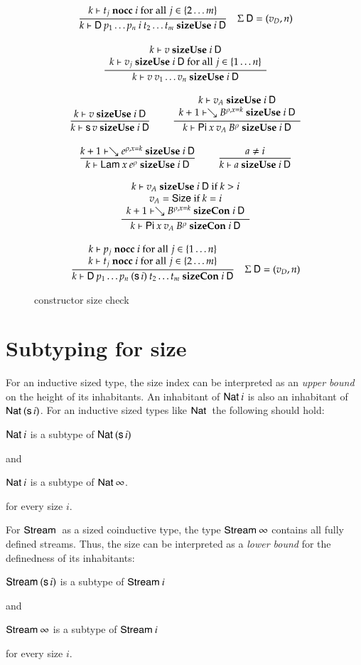 \begin{figure}[htp]
\begin{gather*}
\ \dfrac{k\vdash t_j\mbox{ \textbf{nocc} }i \mbox { for all } j \in \{ 2 \ldots m\}}{k\vdash\mathsf{D} \: p_1 \ldots p_n \: i \: t_2 \ldots t_m\mbox{ \textbf{sizeUse} }i\:\mathsf{D}}
{\quad \Sigma \: \mathsf{D} = (v_D,n)}
\\[2ex]
\ \dfrac{\begin{array}[b]{c}k\vdash v\mbox{ \textbf{sizeUse} }i\:\mathsf{D}\\k\vdash v_j\mbox{ \textbf{sizeUse} }i\:\mathsf{D} \mbox { for all } j \in \{ 1 \ldots n\}\end{array}}{k\vdash v \: v_1 \ldots v_n\mbox{ \textbf{sizeUse} }i\:\mathsf{D}}
\\[2ex]
\ \dfrac{k\vdash v\mbox{ \textbf{sizeUse} }i\:\mathsf{D}}{k\vdash\mathsf{s}\, v\mbox{ \textbf{sizeUse} }i\:\mathsf{D}}
\qquad
\ \dfrac{\begin{array}[b]{c}k\vdash v_A\mbox{ \textbf{sizeUse} }i\:\mathsf{D}\\k+1\vdash\searrow B^{\rho,x=k}\mbox{ \textbf{sizeUse} }i\:\mathsf{D}\end{array}}{k\vdash\mathsf{Pi} \: x \: v_A \: B^{\rho}\mbox{ \textbf{sizeUse} }i\:\mathsf{D}}
\\[2ex]
\ \dfrac{k+1\vdash\searrow e^{\rho,x=k}\mbox{ \textbf{sizeUse} }i\:\mathsf{D}}{k\vdash\mathsf{Lam} \: x \: e^{\rho}\mbox{ \textbf{sizeUse} }i\:\mathsf{D}}
\qquad
\ \dfrac{a \neq i}{k\vdash a\mbox{ \textbf{sizeUse} }i\:\mathsf{D}}
\\[2ex]
\ \dfrac{\begin{array}[b]{c}k\vdash v_A\mbox{ \textbf{sizeUse} }i\:\mathsf{D} \mbox{ if } k > i\\v_A = \mathsf{Size} \mbox { if } k = i \\k+1\vdash\searrow B^{\rho,x=k}\mbox{ \textbf{sizeCon} }i\:\mathsf{D}\end{array}}{k\vdash\mathsf{Pi} \: x \: v_A \: B^{\rho}\mbox{ \textbf{sizeCon} }i\:\mathsf{D}}
\\[2ex]
\ \dfrac{\begin{array}[b]{c}k\vdash p_j\mbox{ \textbf{nocc} }i \mbox { for all } j \in \{ 1 \ldots n\}\\k\vdash t_j\mbox{ \textbf{nocc} }i \mbox { for all } j \in \{ 2 \ldots m\}\end{array}}{k\vdash\mathsf{D} \:p_1 \ldots p_n \: (\mathsf{s}\, i) \:t_2 \ldots t_m\mbox{ \textbf{sizeCon} }i\:\mathsf{D}}
{\quad \Sigma \: \mathsf{D} = (v_D,n)}
\end{gather*}
\caption{constructor size check}
\label{fsizecon}
\end{figure}


\section{Subtyping for size}

For an inductive sized type, the size index can be interpreted as an \emph{upper bound} on the height of its inhabitants.
An inhabitant of $\mathsf{Nat}\: i$ is also an inhabitant of $\mathsf{Nat}\: (\mathsf{s}\, i)$. For an inductive sized types like $\mathsf{Nat}\:$ the following should hold:
\begin{bsp}
$\mathsf{Nat}\: i$ is a subtype of $\mathsf{Nat}\: (\mathsf{s}\, i)$  
\end{bsp}
and
\begin{bsp}
$\mathsf{Nat}\: i$ is a subtype of $\mathsf{Nat}\: \infty$.
\end{bsp}
for every size $i$.

For $\mathsf{Stream}\:$ as a sized coinductive type, the type $\mathsf{Stream}\: \infty$ contains all fully defined streams.
Thus, the size can be interpreted as a \emph{lower bound} for the definedness of its inhabitants:
\begin{bsp}
$\mathsf{Stream}\: (\mathsf{s}\, i) $ is a subtype of $\mathsf{Stream}\: i$
\end{bsp}
and
\begin{bsp}
$\mathsf{Stream}\: \infty$ is a subtype of $\mathsf{Stream}\: i$
\end{bsp}
for every size $i$.



